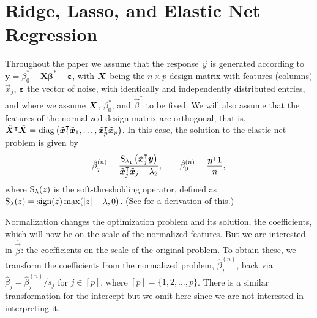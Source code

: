 \section{Ridge, Lasso, and Elastic Net Regression}%
\label{sec:theory}

Throughout the paper we assume that the response \(\vec{y}\) is generated according to
\(\bm{y} = \beta_0^* + \bm{X\beta}^* + \bm{\varepsilon}\), with \(\boldsymbol X\) being the \(n
\times p\) design matrix with features (columns) \(\vec x_j\), \(\bm{\varepsilon}\) the
vector of noise, with identically and independently distributed entries, and where we
assume \(\boldsymbol{X}\), \(\beta_0^*\), and \(\vec{\beta}^*\) to be fixed. We will also assume
that the features of the normalized design matrix are orthogonal, that is,
\(\tilde{\boldsymbol{X}}^\intercal \tilde{\boldsymbol{X}} = \operatorname{diag}\left(\tilde{\boldsymbol{x}}_1^\intercal
\tilde{\boldsymbol{x}}_1, \dots, \tilde{\boldsymbol{x}}_p^\intercal \tilde{\boldsymbol{x}}_p\right)\). In this
case, the solution to the elastic net problem is given by
%
\begin{equation}
  \label{eq:orthogonal-solution-normalized}
  \hat{\beta}^{(n)}_j = \frac{\operatorname{S}_{\lambda_1}\left(\tilde{\boldsymbol{x}}_j^\intercal \boldsymbol{y}\right)}{\tilde{\boldsymbol{x}}_j^\intercal \tilde{\boldsymbol{x}}_j + \lambda_2},
  \qquad
  \hat{\beta}_0^{(n)} = \frac{\boldsymbol{y}^\intercal \boldsymbol{1}}{n},
\end{equation}
%
where \(\operatorname{S}_\lambda(z)\) is the soft-thresholding operator, defined as \(\operatorname{S}_\lambda(z) =
\operatorname{sign}(z) \max(|z| - \lambda, 0)\). (See  for a derivation
of this.)

Normalization changes the optimization problem and its solution, the coefficients, which
will now be on the scale of the normalized features. But we are interested in
\(\hat{\vec{\beta}}\): the coefficients on the scale of the original problem. To obtain
these, we transform the coefficients from the normalized problem, \(\hat\beta^{(n)}_j\),
back via \(\hat\beta_j = \hat\beta^{(n)}_j/s_j\) for \(j \in [p]\), where \([p] =
\{1,2,\dots,p\}\). There is a similar transformation for the intercept but we omit here
since we are not interested in interpreting it.

